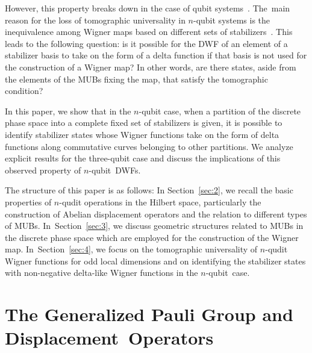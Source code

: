 \documentclass[quantumrep,article,accept,pdftex,moreauthors]{Definitions/mdpi}
\begin{document}
However, this property breaks down in the case of qubit systems~\cite{UniqueWF,
cohomo,contextMagic}. The~main reason for the loss of tomographic universality
in $n$-qubit systems is the inequivalence among Wigner maps based on different
sets of stabilizers~\cite{Bjork2007, qip17}. This leads to the following
question: is it possible for the DWF of an element of a stabilizer basis to take
on the form of a delta function if that basis is not used for the construction
of a Wigner map? In other words, are there states, aside from the elements of
the MUBs fixing the map, that satisfy the tomographic condition?

In this paper, we show that in the $n$-qubit
case, when a partition of the
discrete phase space into a complete fixed set of stabilizers is given, it is
possible to identify stabilizer states whose Wigner functions take on the form
of delta functions along commutative curves belonging to other partitions. We
analyze explicit results for the three-qubit case and discuss the implications
of this observed property of $n$-qubit~DWFs.

The structure of this paper is as follows: In Section~\ref{sec:2}, we recall the basic
properties of $n$-qudit operations in the Hilbert space, particularly the
construction of Abelian displacement operators and the relation to different
types of MUBs. In~Section~\ref{sec:3}, we discuss geometric structures related to MUBs in the
discrete phase space which are employed for the construction of the Wigner
map. In~Section~\ref{sec:4}, we focus on the tomographic universality of $n$-qudit Wigner
functions for odd local dimensions and on identifying the stabilizer states with
non-negative delta-like Wigner functions in the $n$-qubit~case.


\section{The Generalized Pauli Group and Displacement~Operators\label{sec:2}}
\end{document}
